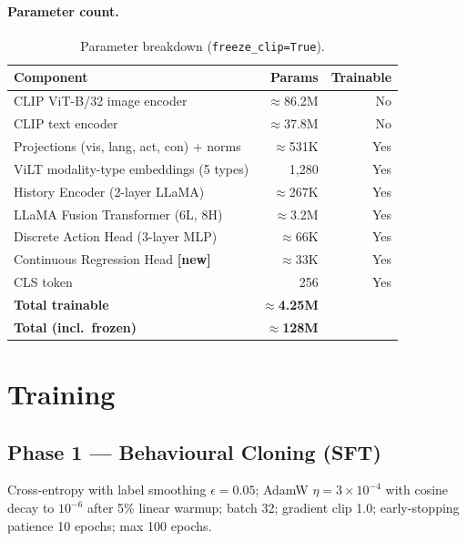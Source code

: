 \documentclass{article}
\newcommand{\NEW}{\textcolor{NewOrange}{\textbf{[new]}}\xspace}
\begin{document}
\paragraph{Parameter count.}
\begin{table}[h]
\centering
\caption{Parameter breakdown (\texttt{freeze\_clip=True}).}
\label{tab:params}
\small
\begin{tabular}{lrr}
\toprule
\textbf{Component} & \textbf{Params} & \textbf{Trainable} \\
\midrule
CLIP ViT-B/32 image encoder              & ${\approx}$86.2M & No  \\
CLIP text encoder                         & ${\approx}$37.8M & No  \\
\midrule
Projections (vis, lang, act, con) + norms & ${\approx}$531K  & Yes \\
ViLT modality-type embeddings (5 types)  & 1,280            & Yes \\
History Encoder (2-layer LLaMA)           & ${\approx}$267K  & Yes \\
LLaMA Fusion Transformer (6L, 8H)         & ${\approx}$3.2M  & Yes \\
Discrete Action Head (3-layer MLP)        & ${\approx}$66K   & Yes \\
Continuous Regression Head \NEW           & ${\approx}$33K   & Yes \\
CLS token                                 & 256              & Yes \\
\midrule
\textbf{Total trainable}                 & ${\approx}$\textbf{4.25M} & \\
\textbf{Total (incl.\ frozen)}           & ${\approx}$\textbf{128M}  & \\
\bottomrule
\end{tabular}
\end{table}

\section{Training}
\label{sec:training}

\subsection{Phase 1 — Behavioural Cloning (SFT)}
Cross-entropy with label smoothing $\epsilon{=}0.05$; AdamW $\eta{=}3{\times}10^{-4}$
with cosine decay to $10^{-6}$ after 5\% linear warmup; batch 32;
gradient clip 1.0; early-stopping patience 10 epochs; max 100 epochs.
\end{document}
